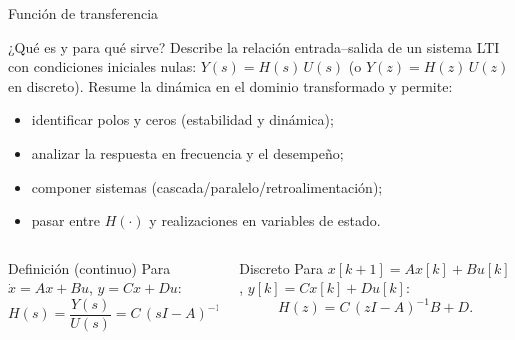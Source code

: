 \documentclass[
    10pt,
    aspectratio=169,
    xcolor={dvipsnames},
    spanish,
    ]{beamer}
\begin{document}
\begin{frame}{Función de transferencia}
\footnotesize
\begin{block}{¿Qué es y para qué sirve?}
  Describe la relación entrada–salida de un sistema LTI con condiciones iniciales nulas:
  $Y(s)=H(s)\,U(s)$ (o $Y(z)=H(z)\,U(z)$ en discreto). Resume la dinámica en el dominio transformado y permite:
  \begin{itemize}\itemsep2pt
    \item identificar polos y ceros (estabilidad y dinámica);
    \item analizar la respuesta en frecuencia y el desempeño;
    \item componer sistemas (cascada/paralelo/retroalimentación);
    \item pasar entre $H(\cdot)$ y realizaciones en variables de estado.
  \end{itemize}
\end{block}
\begin{columns}
  \begin{column}{0.52\textwidth}
    \begin{block}{Definición (continuo)}
      Para $\dot x=Ax+Bu$, $y=Cx+Du$:
      \[ H(s)=\frac{Y(s)}{U(s)}=C\,(sI-A)^{-1}B + D. \]
    \end{block}
  \end{column}
  \begin{column}{0.46\textwidth}
    \begin{block}{Discreto}
      Para $x[k+1]=Ax[k]+Bu[k]$, $y[k]=Cx[k]+Du[k]$:
      \[ H(z)=C\,(zI-A)^{-1}B + D. \]
    \end{block}
  \end{column}
\end{columns}
\end{frame}
\end{document}
